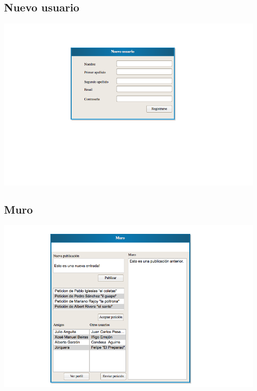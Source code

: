\documentclass[12pt, a4paper, titlepage]{article}
\begin{document}
\subsection{Nuevo usuario}

\begin{center}
	
	\includegraphics[scale=0.7]{Imagenes/registro.png}
	
\end{center}

\subsection{Muro}

\begin{center}
	\includegraphics[scale=0.7]{Imagenes/muro}
\end{center}
\end{document}

